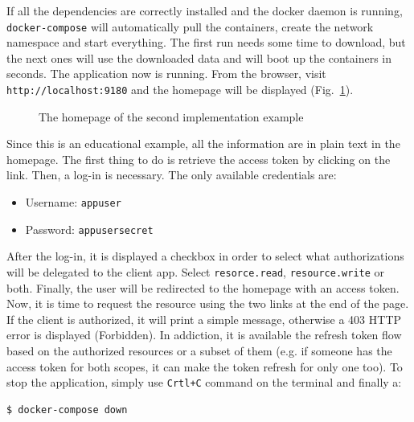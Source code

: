 \noindent If all the dependencies are correctly installed and the docker daemon is running, \texttt{docker-compose} will automatically pull the containers, create the network namespace and start everything. 
The first run needs some time to download, but the next ones will use the downloaded data and will boot up the containers in seconds. The application now is running. From the browser, visit \texttt{http://localhost:9180} and the homepage will be displayed (Fig.~\ref{fig:home2}).

\begin{figure}[h!]
    \centering
    \caption{The homepage of the second implementation example}
    \label{fig:home2}
\end{figure}

\noindent Since this is an educational example, all the information are in plain text in the homepage. The first thing to do is retrieve the access token by clicking on the link. Then, a log-in is necessary. The only available credentials are:

\begin{itemize}
    \item Username: \texttt{appuser}
    \item Password: \texttt{appusersecret}
\end{itemize}

\noindent After the log-in, it is displayed a checkbox in order to select what authorizations will be delegated to the client app. Select \texttt{resorce.read}, \texttt{resource.write} or both. 
Finally, the user will be redirected to the homepage with an access token. Now, it is time to request the resource using the two links at the end of the page. If the client is authorized, it will print a simple message, otherwise a 403 HTTP error is displayed (Forbidden). In addiction, it is available the refresh token flow based on the authorized resources or a subset of them (e.g. if someone has the access token for both scopes, it can make the token refresh for only one too). To stop the application, simply use \texttt{Crtl+C} command on the terminal and finally a:
\begin{lstlisting}[language=bash]
  $ docker-compose down
\end{lstlisting}

